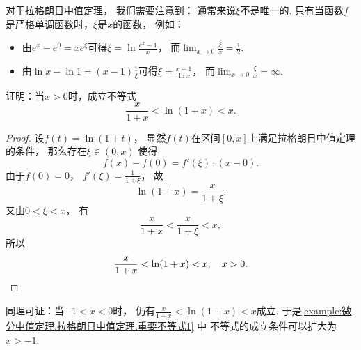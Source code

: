 \begin{remark}
对于\hyperref[theorem:微分中值定理.拉格朗日中值定理]{拉格朗日中值定理}，
我们需要注意到：
通常来说\(\xi\)不是唯一的.
只有当函数\(f\)是严格单调函数时，\(\xi\)是\(x\)的函数，
例如：\begin{itemize}
	\item 由\(e^x - e^0 = x e^\xi\)可得\(\xi = \ln\frac{e^x-1}{x}\)，
	而\(\lim_{x\to0} \frac{\xi}{x} = \frac12\).
	\item 由\(\ln x - \ln1 = (x-1) \frac1\xi\)可得\(\xi = \frac{x-1}{\ln x}\)，
	而\(\lim_{x\to0} \frac{\xi}{x} = \infty\).
\end{itemize}
\end{remark}

\begin{example}\label{example:微分中值定理.拉格朗日中值定理.重要不等式1}
证明：当\(x>0\)时，成立不等式\[
	\frac{x}{1+x} < \ln(1+x) < x.
\]
\begin{proof}
设\(f(t) = \ln(1+t)\)，
显然\(f(t)\)在区间\([0,x]\)上满足拉格朗日中值定理的条件，
那么存在\(\xi\in(0,x)\)
使得\[
	f(x)-f(0)=f'(\xi)\cdot(x-0).
\]
由于\(f(0)=0\)，
\(f'(\xi)=\frac1{1+\xi}\)，
故\[
	\ln(1+x) = \frac{x}{1+\xi}.
\]
又由\(0<\xi<x\)，
有\[
	\frac{x}{1+x}<\frac{x}{1+\xi}<x,
\]
所以\[
	\frac{x}{1+x}<\ln(1+x)<x, \quad x > 0.
	\qedhere
\]
\end{proof}
\end{example}
\begin{remark}
同理可证：当\(-1<x<0\)时，
仍有\(\frac{x}{1+x}<\ln(1+x)<x\)成立.
于是\cref{example:微分中值定理.拉格朗日中值定理.重要不等式1} 中
不等式的成立条件可以扩大为\(x>-1\).
\end{remark}

